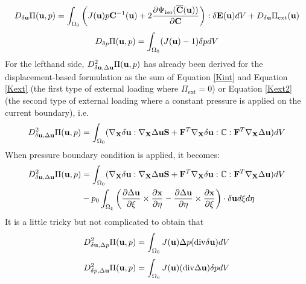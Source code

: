 \begin{equation}\label{rhs1}
D_{\delta\bold{u}}\Pi(\bold{u}, p) = \int_{\Omega_0}\left( J(\bold{u})p\bold{C}^{-1}(\bold{u}) + 
2\frac{\partial{\Psi_\mathrm{iso}(\overline{\bold{C}}(\bold{u}))}}{\partial{\bold{C}}}  \right) : \delta\bold{E}(\bold{u}) dV + D_{\delta\bold{u}}\Pi_\mathrm{ext}(\bold{u})
\end{equation}
\begin{equation}\label{rhs2}
D_{\delta{p}}\Pi(\bold{u}, p) = \int_{\Omega_0} (J(\bold{u}) - 1 )\delta{p} dV
\end{equation}
For the lefthand side, $D_{\delta\bold{u}, \Delta\bold{u}}^2 \Pi(\bold{u}, p)$ has already been derived for the displacement-based formulation as the sum of Equation \ref{Kint} and Equation \ref{Kext} (the first type of external loading where $\Pi_\mathrm{ext} = 0$) or Equation \ref{Kext2} (the second type of external loading where a constant pressure is applied on the current boundary), i.e.
\begin{equation} \label{lhs0}
D_{\delta\bold{u}, \Delta\bold{u}}^2 \Pi(\bold{u}, p) =  \int_{\Omega_0}(\nabla_{\bold{X}}\delta\bold{u} : \nabla_{\bold{X}}\Delta\bold{u}\bold{S} + \bold{F}^T\nabla_{\bold{X}}\delta{\bold{u}} : \mathbb{C} : \bold{F}^T \nabla_{\bold{X}}\Delta\bold{u})dV  \end{equation}
When pressure boundary condition is applied, it becomes:
\begin{equation} \label{lhs1}
\begin{split}
D_{\delta\bold{u}, \Delta\bold{u}}^2 \Pi(\bold{u}, p) 
&= \int_{\Omega_0}(\nabla_{\bold{X}}\delta\bold{u} : \nabla_{\bold{X}}\Delta\bold{u}\bold{S} + \bold{F}^T\nabla_{\bold{X}}\delta{\bold{u}} : \mathbb{C} : \bold{F}^T \nabla_{\bold{X}}\Delta\bold{u})dV  \\
&-  p_0\int_{\Omega_{\xi}}  \left(\frac{\partial \Delta\bold{u}}{\partial{\xi}} \times
\frac{\partial\bold{x}}{\partial\eta} - \frac{\partial \Delta\bold{u}}{\partial{\eta}} \times
\frac{\partial\bold{x}}{\partial\xi}    \right) \cdot \delta{\bold{u}} d\xi d\eta
\end{split}
\end{equation}
It is a little tricky but not complicated to obtain that
\begin{equation} \label{lhs2}
D_{\delta\bold{u}, \Delta{p}}^2 \Pi(\bold{u}, p) = \int_{\Omega_0} J(\bold{u})\Delta{p}(\mathrm{div}\delta{\bold{u}})dV
\end{equation}
\begin{equation} \label{lhs3}
D_{\delta{p}, \Delta\bold{u}}^2 \Pi(\bold{u}, p) = \int_{\Omega_0} J(\bold{u})(\mathrm{div}\Delta{\bold{u}})\delta{p}dV
\end{equation}
